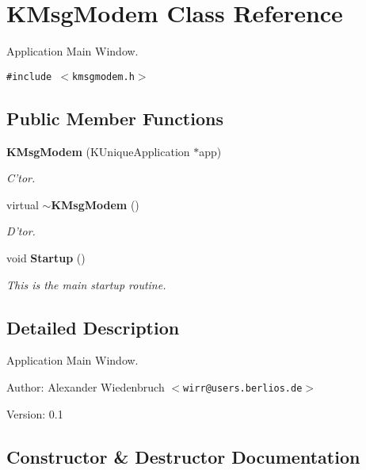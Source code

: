\section{KMsg\-Modem Class Reference}
\label{classKMsgModem}
Application Main Window.  


{\tt \#include $<$kmsgmodem.h$>$}

\subsection*{Public Member Functions}
\begin{CompactItemize}
\item 
{\bf KMsg\-Modem} (KUnique\-Application $\ast$app)
\begin{CompactList}\small\item\em C'tor. \item\end{CompactList}\item 
virtual {\bf $\sim$KMsg\-Modem} ()
\begin{CompactList}\small\item\em D'tor. \item\end{CompactList}\item 
void {\bf Startup} ()
\begin{CompactList}\small\item\em This is the main startup routine. \item\end{CompactList}\end{CompactItemize}


\subsection{Detailed Description}
Application Main Window. 

\begin{Desc}
\item[Author:]Alexander Wiedenbruch $<${\tt wirr@users.berlios.de}$>$ \end{Desc}
\begin{Desc}
\item[Version:]0.1 \end{Desc}




\subsection{Constructor \& Destructor Documentation}
